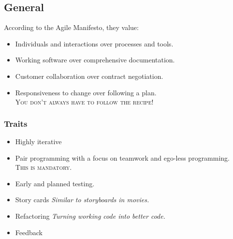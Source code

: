 \documentclass{report}
\begin{document}
			\subsection{General}
				According to the Agile Manifesto, they value:
				\begin{itemize}
					\item Individuals and interactions over processes and tools.
					\item Working software over comprehensive documentation.
					\item Customer collaboration over contract negotiation.
					\item Responsiveness to change over following a plan.\\
						\textsc{You don't always have to follow the recipe!}
				\end{itemize}
				\subsubsection{Traits}
					\begin{itemize}
						\item Highly iterative
						\item Pair programming with a focus on teamwork and ego-less programming.\\
							\textsc{This is mandatory.}
						\item Early and planned testing.
						\item Story cards \textit{Similar to storyboards in movies.}
						\item Refactoring \textit{Turning working code into better code.}
						\item Feedback
					\end{itemize}
\end{document}
